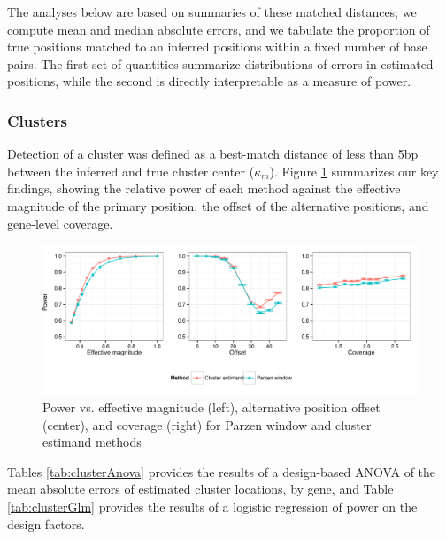 The analyses below are based on summaries of these matched distances; we compute mean and median absolute errors, and we tabulate the proportion of true positions matched to an inferred positions within a fixed number of base pairs.
The first set of quantities summarize distributions of errors in estimated positions, while the second is directly interpretable as a measure of power.

\subsubsection{Clusters}
\label{sec:clusterPower}

Detection of a cluster was defined as a best-match distance of less than 5bp between the inferred and true cluster center ($\kappa_m$).
Figure \ref{fig:powerCluster} summarizes our key findings, showing the relative power of each method against the effective magnitude of the primary position, the offset of the alternative positions, and gene-level coverage.
%
\begin{figure}
\centering
\includegraphics[width=\textwidth]{figures/nucleosomes/figure_power_cluster_3-panel}
\caption{Power vs. effective magnitude (left), alternative position offset (center), and coverage (right) for Parzen window and cluster estimand methods \label{fig:powerCluster}}
\end{figure}
%
Tables \ref{tab:clusterAnova} provides the results of a design-based ANOVA of the mean absolute errors of  estimated cluster locations, by gene, and Table \ref{tab:clusterGlm} provides the results of a logistic regression of power on the design factors.

